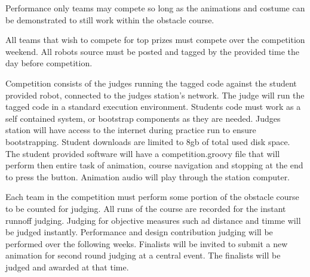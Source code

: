 \documentclass{article}
\begin{document}
\begin{enumerate}
Performance only teams may compete so long as the animations and costume can be demonstrated to still work within the obstacle course. 

All teams that wish to compete for top prizes must compete over the competition weekend. All robots source must be posted and tagged by the provided time the day before competition. 

Competition consists of the judges running the tagged code against the student provided robot, connected to the judges station's network. The judge will run the tagged code in a standard execution environment. Students code must work as a self contained system, or bootstrap components as they are needed. Judges station will have access to the internet during practice run to ensure bootstrapping. Student downloads are limited to 8gb of total used disk space. The student provided software will have a competition.groovy file that will perform then entire task of animation, course navigation and stopping at the end to press the button. Animation audio will play through the station computer. 

Each team in the competition must perform some portion of the obstacle course to be counted for judging. All runs of the course are recorded for the instant runnoff judging. Judging for objective measures such ad distance and timme will be judged instantly. Performance and design contribution judging will be performed over the following weeks. Finalists will be invited to submit a new animation for second round judging at a central event. The finalists will be judged and awarded at that time. 



 

\end{enumerate}
\vspace{1cm}
 
 
\end{document}
